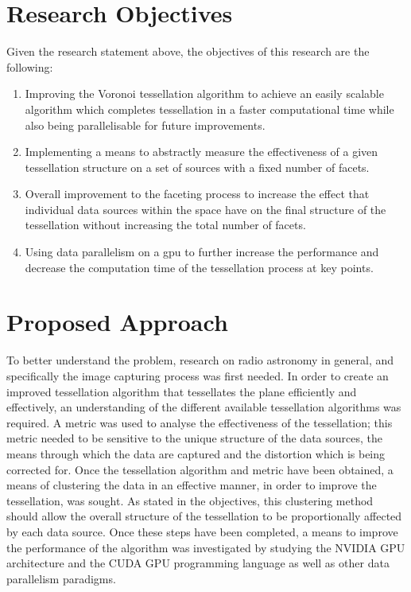 \section{Research Objectives}\label{int:sec:goals}
Given the research statement above, the objectives of this research are the following:
\begin{enumerate}
\item Improving the Voronoi tessellation algorithm to achieve an easily scalable algorithm which completes tessellation in a faster computational time while also being parallelisable for future improvements.
\item Implementing a means to abstractly measure the effectiveness of a given tessellation structure on a set of sources with a fixed number of facets.
\item Overall improvement to the faceting process to increase the effect that individual data sources within the space have on the final structure of the tessellation without increasing the total number of facets.
\item Using data parallelism on a \gls{gpu} to further increase the performance and decrease the computation time of the tessellation process at key points.
\end{enumerate}
\section{Proposed Approach}
To better understand the problem, research on radio astronomy in general, and specifically the image capturing process was first needed. In order to create an improved tessellation algorithm that tessellates the plane efficiently and effectively, an understanding of the different available tessellation algorithms was required. A metric was used to analyse the effectiveness of the tessellation; this metric needed to be sensitive to the unique structure of the data sources, the means through which the data are captured and the distortion which is being corrected for. Once the tessellation algorithm and metric have been obtained, a means of clustering the data in an effective manner, in order to improve the tessellation, was sought. As stated in the objectives, this clustering method should allow the overall structure of the tessellation to be proportionally affected by each data source. Once these steps have been completed, a means to improve the performance of the algorithm was investigated by studying the NVIDIA GPU architecture and the CUDA GPU programming language as well as other data parallelism paradigms.

